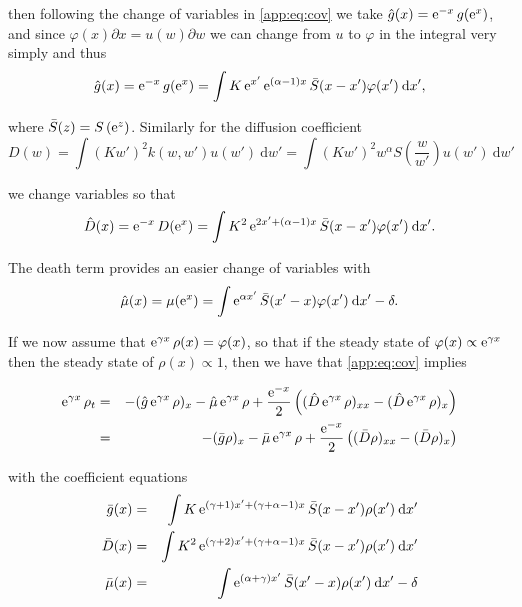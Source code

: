 \documentclass[../main.tex]{subfiles}
\begin{document}
  then following the change of variables in \autoref{app:eq:cov} we take $\hat{g}(x) = \operatorname{e}^{-x}g(\operatorname{e}^{x})$, and since $\varphi(x) \partial x = u(w) \partial w$ we can change from $u$ to $\varphi$ in the integral very simply and thus
  \begin{equation}
    \hat{g}(x) = \operatorname{e}^{-x} g(\operatorname{e}^{x}) = \int K \operatorname{e}^{x'} \operatorname{e}^{(\alpha -1) x} \bar{S}( x - x' ) \varphi(x') \: \mathrm{d} x',
  \end{equation}

  where $\bar{S}(z) = S \left(\operatorname{e}^{z} \right)$. Similarly for the diffusion coefficient
  \begin{equation}
    D(w) = \int (K w')^2 k(w, w') u(w') \: \mathrm{d} w' = \int (K w')^2 w^{\alpha} S \left( \frac{w}{w'} \right) u(w') \: \mathrm{d} w'
  \end{equation}

  we change variables so that
  \begin{equation}
    \hat{D}(x) = \operatorname{e}^{-x} D(\operatorname{e}^{x}) = \int K^2 \operatorname{e}^{2x' + (\alpha-1) x} \bar{S}(x - x') \varphi(x') \: \mathrm{d} x'.
  \end{equation}

  The death term provides an easier change of variables with
  \begin{equation}
    \hat{\mu}(x) = \mu(\operatorname{e}^{x}) = \int \operatorname{e}^{\alpha x'} \bar{S}(x' - x) \varphi(x') \: \mathrm{d}x' - \delta.
  \end{equation}

  If we now assume that $\operatorname{e}^{\gamma x} \rho(x) = \varphi(x)$, so that if the steady state of $\varphi(x) \propto \operatorname{e}^{\gamma x}$ then the steady state of $\rho(x) \propto 1$, then we have that \autoref{app:eq:cov} implies

  \begin{eqnarray}
    \operatorname{e}^{\gamma x} \rho_t
    &=& - (\hat{g} \operatorname{e}^{\gamma x} \rho)_x - \hat{\mu} \operatorname{e}^{\gamma x} \rho + \frac{\operatorname{e}^{-x}}{2} \left( (\hat{D}\operatorname{e}^{\gamma x} \rho)_{xx} - (\hat{D} \operatorname{e}^{\gamma x} \rho)_x \right) \nonumber \\
    &=& - (\bar{g} \rho)_x - \bar{\mu} \operatorname{e}^{\gamma x} \rho + \frac{\operatorname{e}^{-x}}{2} \left( (\bar{D} \rho)_{xx} - (\bar{D} \rho)_x \right)
  \end{eqnarray}

  with the coefficient equations
  \begin{eqnarray}
    \bar{g}(x) &=& \int K \operatorname{e}^{(\gamma + 1) x' + (\gamma + \alpha - 1) x} \bar{S}( x - x' ) \rho(x') \: \mathrm{d} x' \\
    \bar{D}(x) &=& \int K^2 \operatorname{e}^{(\gamma + 2) x' + (\gamma + \alpha - 1) x} \bar{S}( x - x' ) \rho(x') \: \mathrm{d} x' \\
    \bar{\mu}(x) &=& \int \operatorname{e}^{(\alpha + \gamma) x'} \bar{S}(x' - x)\rho(x') \: \mathrm{d}x' - \delta
  \end{eqnarray}
\end{document}
